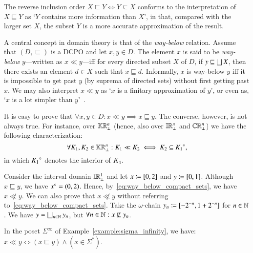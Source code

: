 \documentclass[11pt,times]{article}
\begin{document}
\begin{remark}
  The reverse inclusion order $X \sqsubseteq Y \iff Y \subseteq X$
  conforms to the interpretation of $X \sqsubseteq Y$ as `$Y$ contains
  more information than $X$', in that, compared with the larger set
  $X$, the subset $Y$ is a more accurate approximation of the result.
\end{remark}

A central concept in domain theory is that of the \emph{way-below}
relation. Assume that $(D, \sqsubseteq)$ is a \ac{DCPO} and let
$x,y \in D$. The element $x$ is said to be \emph{way-below}
$y$---written as $x \ll y$---iff for every directed subset $X$ of $D$,
if $y \sqsubseteq \lub X$, then there exists an element $d \in X$ such
that $x \sqsubseteq d$. Informally, $x$ is way-below $y$ iff it is
impossible to get past $y$ (by suprema of directed sets) without first
getting past $x$. We may also interpret $x \ll y$ as `$x$ is a
finitary approximation of $y$', or even as, `$x$ is a lot simpler than
$y$'~\parencite[Section~2.2.1]{AbramskyJung94-DT}.

It is easy to prove that
$\forall x, y \in D: x \ll y \implies x \sqsubseteq y$. The converse,
however, is not always true. For instance, over $\kCPPO{\R^n\lift}$
(hence, also over $\intvaldom[\R^n\lift]$ and $\cCPPO{\R^n\lift}$) we
have the following characterization:
%
\begin{equation}
  \label{eq:way_below_compact_sets}
  \forall K_1, K_2 \in \kCPPO{\R^n\lift}: K_1 \ll K_2 \iff K_2 \subseteq \interiorOf{K_1},
\end{equation}
%
in which $\interiorOf{K_1}$ denotes the interior of $K_1$.

\begin{example}
  Consider the interval domain $\intvaldom[\R^1\lift]$ and let
  $x \defeq [0,2]$ and $y \defeq [0,1]$. Although $x \sqsubseteq y$,
  we have $\interiorOf{x} = (0,2)$. Hence,
  by~\eqref{eq:way_below_compact_sets}, we have $x \not \ll y$. We can
  also prove that $x \not \ll y$ without referring
  to~\eqref{eq:way_below_compact_sets}. Take the $\omega$-chain
  $y_n \defeq [-2^{-n}, 1 + 2^{-n}]$ for $n \in \N$. We have
  $y = \lub_{n \in \N} y_n$, but
  $\forall n \in \N: x \nsqsubseteq y_n$.
\end{example}


\begin{example}
  In the poset $\Sigma^\infty$ of
  Example~\ref{example:sigma_infinity}, we have: $x \ll y \iff (x \sqsubseteq y) \wedge (x \in \Sigma^*)$.
\end{example}
\end{document}
